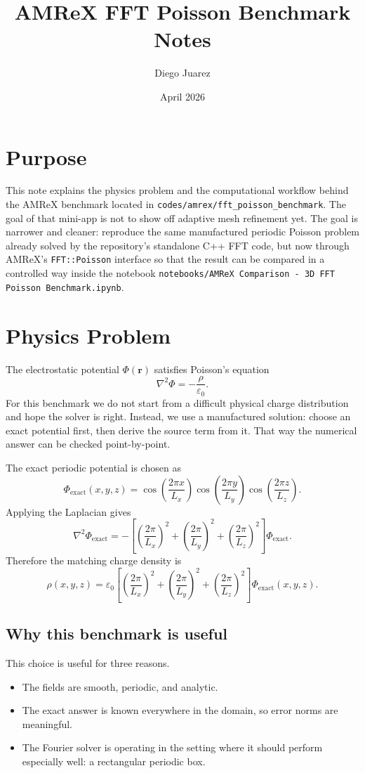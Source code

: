 \documentclass[11pt]{article}
\title{AMReX FFT Poisson Benchmark Notes}
\author{Diego Juarez}
\date{April 2026}
\begin{document}
\maketitle

\section*{Purpose}
This note explains the physics problem and the computational workflow behind the AMReX benchmark located in
\texttt{codes/amrex/fft\_poisson\_benchmark}. The goal of that mini-app is not to show off adaptive mesh refinement yet. The goal is narrower and cleaner: reproduce the same manufactured periodic Poisson problem already solved by the repository's standalone C++ FFT code, but now through AMReX's \texttt{FFT::Poisson} interface so that the result can be compared in a controlled way inside the notebook
\texttt{notebooks/AMReX Comparison - 3D FFT Poisson Benchmark.ipynb}.

\section{Physics Problem}
The electrostatic potential $\Phi(\mathbf r)$ satisfies Poisson's equation
\[
\nabla^2 \Phi = -\frac{\rho}{\varepsilon_0}.
\]
For this benchmark we do not start from a difficult physical charge distribution and hope the solver is right. Instead, we use a manufactured solution: choose an exact potential first, then derive the source term from it. That way the numerical answer can be checked point-by-point.

The exact periodic potential is chosen as
\[
\Phi_{\text{exact}}(x,y,z)
=
\cos\!\left(\frac{2\pi x}{L_x}\right)
\cos\!\left(\frac{2\pi y}{L_y}\right)
\cos\!\left(\frac{2\pi z}{L_z}\right).
\]
Applying the Laplacian gives
\[
\nabla^2 \Phi_{\text{exact}}
=
-\left[
\left(\frac{2\pi}{L_x}\right)^2
+
\left(\frac{2\pi}{L_y}\right)^2
+
\left(\frac{2\pi}{L_z}\right)^2
\right]\Phi_{\text{exact}}.
\]
Therefore the matching charge density is
\[
\rho(x,y,z)
=
\varepsilon_0
\left[
\left(\frac{2\pi}{L_x}\right)^2
+
\left(\frac{2\pi}{L_y}\right)^2
+
\left(\frac{2\pi}{L_z}\right)^2
\right]
\Phi_{\text{exact}}(x,y,z).
\]

\subsection*{Why this benchmark is useful}
This choice is useful for three reasons.
\begin{itemize}
\item The fields are smooth, periodic, and analytic.
\item The exact answer is known everywhere in the domain, so error norms are meaningful.
\item The Fourier solver is operating in the setting where it should perform especially well: a rectangular periodic box.
\end{itemize}
\end{document}
